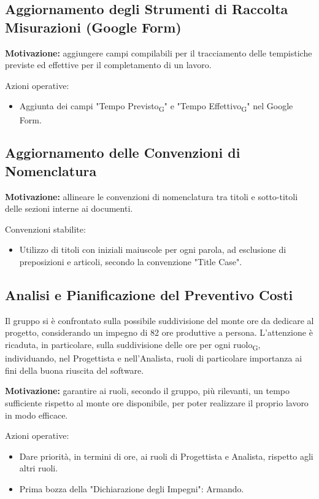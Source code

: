 \subsection{Aggiornamento degli Strumenti di Raccolta Misurazioni (Google Form)}
\textbf{Motivazione:} aggiungere campi compilabili per il tracciamento delle tempistiche previste ed effettive per il completamento di un lavoro.

Azioni operative:
\begin{itemize}
    \item Aggiunta dei campi "Tempo Previsto\textsubscript{G}" e "Tempo Effettivo\textsubscript{G}" nel Google Form.
\end{itemize}

\subsection{Aggiornamento delle Convenzioni di Nomenclatura}
\textbf{Motivazione:} allineare le convenzioni di nomenclatura tra titoli e sotto-titoli delle sezioni interne ai documenti.

Convenzioni stabilite:
\begin{itemize}
    \item Utilizzo di titoli con iniziali maiuscole per ogni parola, ad esclusione di preposizioni e articoli, secondo la convenzione "Title Case".
\end{itemize}

\subsection{Analisi e Pianificazione del Preventivo Costi}
Il gruppo si è confrontato sulla possibile suddivisione del monte ore da dedicare al progetto, considerando un impegno di 82 ore produttive a persona. L'attenzione è ricaduta, in particolare, sulla suddivisione delle ore per ogni ruolo\textsubscript{G}, individuando, nel Progettista e nell'Analista, ruoli di particolare importanza ai fini della buona riuscita del software.

\textbf{Motivazione:} garantire ai ruoli, secondo il gruppo, più rilevanti, un tempo sufficiente rispetto al monte ore disponibile, per poter realizzare il proprio lavoro in modo efficace.

Azioni operative:
\begin{itemize}
    \item Dare priorità, in termini di ore, ai ruoli di Progettista e Analista, rispetto agli altri ruoli.
    \item Prima bozza della "Dichiarazione degli Impegni": Armando.
\end{itemize}


